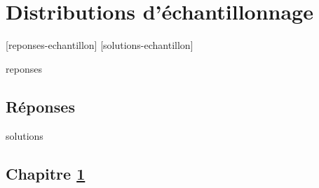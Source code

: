 \documentclass[letterpaper,11pt]{memoir}\usepackage[]{graphicx}\usepackage[]{color}
\newcounter{exercice}[chapter]
\begin{document}


%








\chapter{Distributions d'échantillonnage}
\label{chap:C}

[reponses-echantillon]
[solutions-echantillon]

\begin{Filesave}{reponses}
\bigskip
\section*{Réponses}

\end{Filesave}

\begin{Filesave}{solutions}
\section*{Chapitre \ref{chap:C}}

\end{Filesave}






\end{document}
